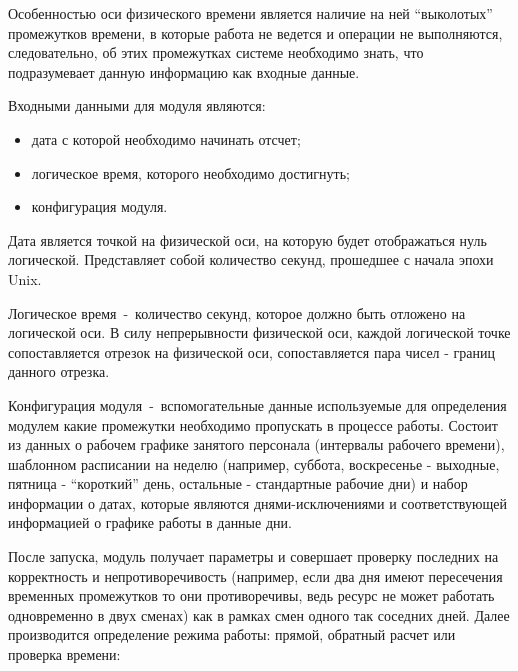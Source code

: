 \indent Особенностью оси физического времени является наличие на ней ``выколотых'' промежутков времени, в которые работа не ведется и операции не выполняются, следовательно, об этих промежутках системе необходимо знать, что подразумевает данную информацию как входные данные.

\indent Входными данными для модуля являются:

\begin{itemize}
	\item дата с которой необходимо начинать отсчет;
	\item логическое время, которого необходимо достигнуть;
	\item конфигурация модуля.
\end{itemize}

\indent Дата является точкой на физической оси, на которую будет отображаться нуль логической. Представляет собой количество секунд, прошедшее с начала эпохи Unix.

\indent Логическое время~-~количество секунд, которое должно быть отложено на логической оси. В силу непрерывности физической оси, каждой логической точке сопоставляется отрезок на физической оси, сопоставляется пара чисел - границ данного отрезка.

\indent Конфигурация модуля~-~вспомогательные данные используемые для определения модулем какие промежутки необходимо пропускать в процессе работы.
Состоит из данных о рабочем графике занятого персонала (интервалы рабочего времени), шаблонном расписании на неделю (например, суббота, воскресенье - выходные, пятница - ``короткий'' день, остальные - стандартные рабочие дни) и набор информации о датах, которые являются днями-исключениями и соответствующей информацией о графике работы в данные дни.

\indent После запуска, модуль получает параметры и совершает проверку последних на корректность и непротиворечивость (например, если два дня имеют пересечения временных промежутков то они противоречивы, ведь ресурс не может работать одновременно в двух сменах) как в рамках смен одного так соседних дней.
Далее производится определение режима работы: прямой, обратный расчет или проверка времени:

